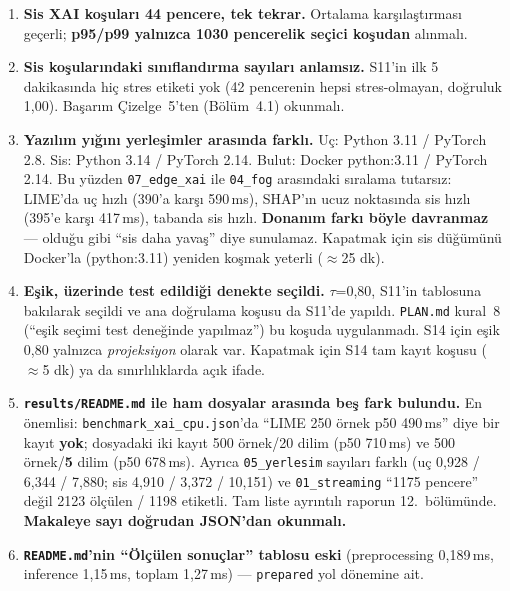 \documentclass[11pt,a4paper]{article}
\newcommand{\ms}{\,ms}
\newcommand{\kod}[1]{\texttt{\small #1}}
\newcommand{\dosya}[1]{\texttt{\footnotesize #1}}
\begin{document}
\begin{enumerate}[leftmargin=1.5em,itemsep=0.3em]
\item \textbf{Sis XAI koşuları 44 pencere, tek tekrar.} Ortalama
karşılaştırması geçerli; \textbf{p95/p99 yalnızca 1030 pencerelik seçici
koşudan} alınmalı.

\item \textbf{Sis koşularındaki sınıflandırma sayıları anlamsız.} S11'in ilk
5 dakikasında hiç stres etiketi yok (42 pencerenin hepsi stres-olmayan,
doğruluk 1{,}00). Başarım Çizelge~5'ten (Bölüm~4.1) okunmalı.

\item \textbf{Yazılım yığını yerleşimler arasında farklı.} Uç: Python 3.11 /
PyTorch 2.8. Sis: Python 3.14 / PyTorch 2.14. Bulut: Docker python:3.11 /
PyTorch 2.14. Bu yüzden \dosya{07\_edge\_xai} ile \dosya{04\_fog} arasındaki
sıralama tutarsız: LIME'da uç hızlı (390'a karşı 590\ms), SHAP'ın ucuz
noktasında sis hızlı (395'e karşı 417\ms), tabanda sis hızlı. \textbf{Donanım
farkı böyle davranmaz} --- olduğu gibi ``sis daha yavaş'' diye sunulamaz.
Kapatmak için sis düğümünü Docker'la (python:3.11) yeniden koşmak yeterli
($\approx$25 dk).

\item \textbf{Eşik, üzerinde test edildiği denekte seçildi.} $\tau$=0{,}80,
S11'in tablosuna bakılarak seçildi ve ana doğrulama koşusu da S11'de yapıldı.
\dosya{PLAN.md} kural~8 (``eşik seçimi test deneğinde yapılmaz'') bu koşuda
uygulanmadı. S14 için eşik 0{,}80 yalnızca \emph{projeksiyon} olarak var.
Kapatmak için S14 tam kayıt koşusu ($\approx$5 dk) ya da sınırlılıklarda
açık ifade.

\item \textbf{\dosya{results/README.md} ile ham dosyalar arasında beş fark
bulundu.} En önemlisi: \dosya{benchmark\_xai\_cpu.json}'da ``LIME 250 örnek
p50 490\ms'' diye bir kayıt \textbf{yok}; dosyadaki iki kayıt 500 örnek/20
dilim (p50 710\ms) ve 500 örnek/\textbf{5} dilim (p50 678\ms). Ayrıca
\dosya{05\_yerlesim} sayıları farklı (uç 0{,}928 / 6{,}344 / 7{,}880; sis
4{,}910 / 3{,}372 / 10{,}151) ve \dosya{01\_streaming} ``1175 pencere'' değil
2123 ölçülen / 1198 etiketli. Tam liste ayrıntılı raporun 12.\ bölümünde.
\textbf{Makaleye sayı doğrudan JSON'dan okunmalı.}

\item \textbf{\dosya{README.md}'nin ``Ölçülen sonuçlar'' tablosu eski}
(preprocessing 0{,}189\ms, inference 1{,}15\ms, toplam 1{,}27\ms) ---
\kod{prepared} yol dönemine ait.
\end{enumerate}
\end{document}
